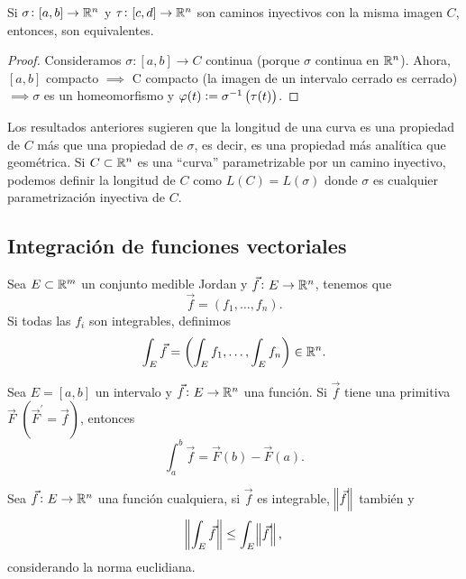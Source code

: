 \begin{prop}
    Si $\sigma \colon [a, b] \to \mathbb{R}^n$ y $\tau \colon [c,d] \to \mathbb{R}^n$ son caminos inyectivos con la misma imagen $C$, entonces, son equivalentes.
\end{prop}

\begin{proof}
    Consideramos $\sigma \colon [a,b] \to C$ continua (porque $\sigma$ continua en $\mathbb{R}^n$). Ahora, $[a, b]$ compacto $\implies$ C compacto
    (la imagen de un intervalo cerrado es cerrado) $\implies \sigma$ es un homeomorfismo y $\varphi(t) := \sigma^{-1}\left( \tau(t) \right)$.
\end{proof}

\begin{obs}
    Los resultados anteriores sugieren que la longitud de una curva es una propiedad de $C$ más que una propiedad de $\sigma$, es decir,
    es una propiedad más analítica que geométrica. Si $C \subset \mathbb{R}^n$ es una ``curva'' parametrizable por un camino inyectivo,
    podemos definir la longitud de $C$ como $L(C) = L(\sigma)$ donde $\sigma$ es cualquier parametrización inyectiva de $C$.
\end{obs}

\subsection*{Integración de funciones vectoriales}

\begin{defi*}
    Sea $E \subset \mathbb{R}^m$ un conjunto medible Jordan y $\vec{f} \colon E \to \mathbb{R}^n$, tenemos que
    \[
        \vec{f} = \left( f_1,\dots, f_n \right).
    \]
    Si todas las $f_i$ son integrables, definimos
    \[
        \int_E \vec{f} = \left( \int_E f_1 , \dots, \int_E f_n \right) \in \mathbb{R}^n.
    \]
\end{defi*}

\begin{prop}\label{prop:regla_barrow}
    Sea $E = [a, b]$ un intervalo y $\vec{f} \colon E \to \mathbb{R}^n$ una función. Si $\vec{f}$ tiene una primitiva $\vec{F}$
    $\left( \vec{F}^\prime = \vec{f}\right)$, entonces
    \[
        \int^b_a \vec{f} = \vec{F}(b) - \vec{F}(a).
    \]
\end{prop}

\begin{prop}
    Sea $\vec{f} \colon E \to \mathbb{R}^n$ una función cualquiera, si $\vec{f}$ es integrable, $\norm{\vec{f}}$ tambi\'en y
    \[
        \norm{\int_E \vec{f}} \leq \int_E \norm{\vec{f}},
    \]
    considerando la norma euclidiana.
\end{prop}

